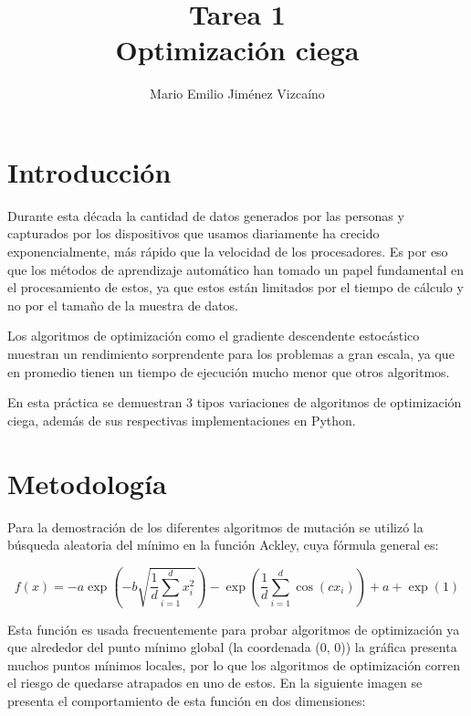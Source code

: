 \documentclass[sigconf,authorversion,nonacm]{acmart}
\begin{document}
\title{Tarea 1 \\ Optimización ciega}

\author{Mario Emilio Jiménez Vizcaíno}

\maketitle

\section{Introducción}
Durante esta década la cantidad de datos generados por las personas y capturados por los dispositivos que usamos diariamente ha crecido exponencialmente, más rápido que la velocidad de los procesadores. Es por eso que los métodos de aprendizaje automático han tomado un papel fundamental en el procesamiento de estos, ya que estos están limitados por el tiempo de cálculo y no por el tamaño de la muestra de datos.

Los algoritmos de optimización como el gradiente descendente estocástico muestran un rendimiento sorprendente para los problemas a gran escala, ya que en promedio tienen un tiempo de ejecución mucho menor que otros algoritmos.

En esta práctica se demuestran 3 tipos variaciones de algoritmos de optimización ciega, además de sus respectivas implementaciones en Python.


\section{Metodología}
Para la demostración de los diferentes algoritmos de mutación se utilizó la búsqueda aleatoria del mínimo en la función Ackley, cuya fórmula general es:

$$f(x) = -a \exp \left(-b \sqrt{\frac{1}{d} \sum_{i=1}^{d} x_i^2} \right) -\exp \left(\frac{1}{d} \sum_{i=1}^{d} \cos (c x_i) \right) + a + \exp (1)$$

Esta función es usada frecuentemente para probar algoritmos de optimización ya que alrededor del punto mínimo global (la coordenada (0, 0)) la gráfica presenta muchos puntos mínimos locales, por lo que los algoritmos de optimización corren el riesgo de quedarse atrapados en uno de estos. En la siguiente imagen se presenta el comportamiento de esta función en dos dimensiones:
\end{document}
